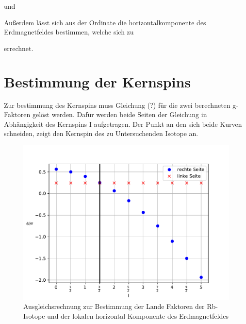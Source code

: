 

und



Außerdem lässt sich aus der Ordinate die horizontalkomponente des Erdmagnetfeldes bestimmen,
welche sich zu



errechnet.

\section{Bestimmung der Kernspins}
Zur bestimmung des Kernspins muss Gleichung (?) für die zwei berechneten g-Faktoren gelöst werden. Dafür werden beide Seiten der Gleichung in Abhängigkeit
des Kernspins I aufgetragen. Der Punkt an den sich beide Kurven schneiden, zeigt den Kernspin des zu Untersuchenden Isotope an.

\begin{figure}[H]
\centering
\includegraphics[scale=0.8]{./optischesPumpen/img/coreSpin1.pdf}
\caption{Ausgleichsrechnung zur Bestimmung der Lande Faktoren der Rb-Isotope und der lokalen horizontal Komponente des Erdmagnetfeldes}
\label{aufbau}
\end{figure}

